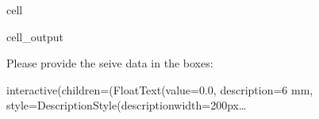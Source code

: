 \documentclass[letterpaper,10pt,english]{jupyterBook}
\begin{document}
\begin{sphinxuseclass}{cell}
\begin{sphinxVerbatimOutput}
\begin{sphinxuseclass}{cell_output}
\begin{sphinxVerbatim}[commandchars=\\\{\}]
Please provide the seive data in the boxes:  
\end{sphinxVerbatim}

\begin{sphinxVerbatim}[commandchars=\\\{\}]
interactive(children=(FloatText(value=0.0, description=\PYGZsq{}6 mm\PYGZsq{}, style=DescriptionStyle(description\PYGZus{}width=\PYGZsq{}200px…
\end{sphinxVerbatim}

\end{sphinxuseclass}\end{sphinxVerbatimOutput}

\end{sphinxuseclass}
\end{document}
